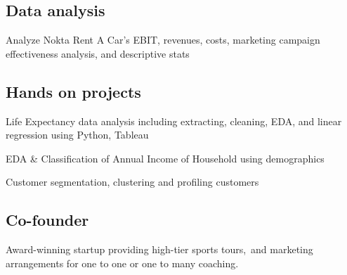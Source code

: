 \documentclass[letter,10pt]{article}
\begin{document}
\subsection{{Data analysis}}
\justify{}
\begin{zitemize}
\item Analyze Nokta Rent A Car's EBIT, revenues, costs, marketing campaign effectiveness analysis, and descriptive stats
\end{zitemize}

\vspace{10 pt}
\subsection{{Hands on projects}}
\begin{zitemize}
\item Life Expectancy data analysis including extracting, cleaning, EDA, and linear regression using Python, Tableau
\item EDA \& Classification of Annual Income of Household using demographics
\item Customer segmentation, clustering and profiling customers
\end{zitemize}

\subsection{Co-founder}
\begin{zitemize}
\item Award-winning startup providing high-tier sports tours,\ and marketing arrangements for one to one or one to many coaching.
\end{zitemize}
\end{document}
